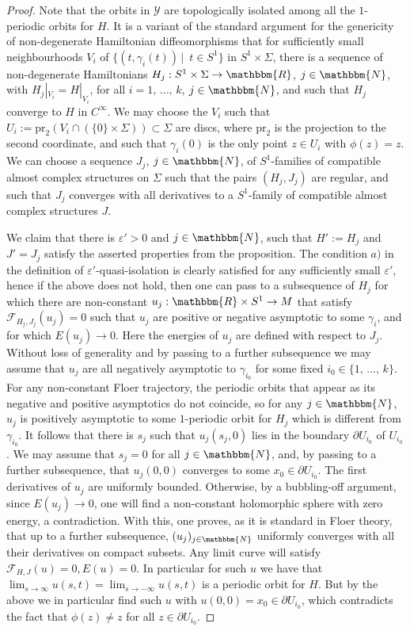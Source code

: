 \documentclass[AHL,Unicode,longabstracts,published]{cedram}
\newcommand{\N}{\mathbbm{N}}
\newcommand{\R}{\mathbbm{R}}
\newcommand{\pr}{\mathrm{pr}}
\newcommand{\clY}{\mathcal{Y}}
\newcommand{\clF}{\mathcal{F}}
\newcounter{claim}
\begin{document}
\begin{proof}
Note that the orbits in $\clY$ are topologically isolated among all the $1$-periodic orbits for $H$. It is a variant of the standard argument for the genericity of non-degenerate Hamiltonian diffeomorphisms that for sufficiently small neighbourhoods $V_i$ of $\{(t,\gamma_i(t))\, |\,$ $t \in S^1 \}$ in $S^1 \times \Sigma$, there is a sequence of non-degenerate Hamiltonians $H_j:S^1 \times \Sigma \to \R$, $j\in \N$, with $H_j|_{V_i} = H|_{V_i}$, for all $i=1, \,\ldots,\, k$, $j\in \N$, and such that $H_j$ converge to $H$ in $C^{\infty}$. We may choose the $V_i$ such that $U_i := {\pr}_2(V_i \cap (\{0\} \times \Sigma))\subset \Sigma$ are discs, where ${\pr}_2$ is the projection to the second coordinate, and such that $\gamma_i(0)$ is the only point $z\in U_i$ with $\phi(z)= z$. We can choose a sequence $J_j$, $j\in \N$, of $S^1$-families of compatible almost complex structures on $\Sigma$ such that the pairs $(H_j,J_j)$ are regular, and such that $J_j$ converges with all derivatives to a $S^1$-family of compatible almost complex structures $J$.

We claim that there is $\varepsilon'>0$ and $j\in \N$, such that $H':=H_j$ and $J'=J_j$ satisfy the asserted properties from the proposition. The condition $a)$ in the definition of $\varepsilon'$-quasi-isolation is clearly satisfied for any sufficiently small $\varepsilon'$, hence if the above does not hold, then one can pass to a subsequence of $H_j$ for which there are non-constant $u_{j}: \R \times S^1\to M$ that satisfy $\clF_{H_{j},J_{j}} (u_j)= 0$ such that $u_j$ are positive or negative asymptotic to some $\gamma_i$, and for which $E(u_j) \to 0$. Here the energies of $u_j$ are defined with respect to $J_j$. Without loss of generality and by passing to a further subsequence we may assume that $u_{j}$ are all negatively asymptotic to $\gamma_{i_0}$ for some fixed $i_0\in \{1, \,\ldots,\, k\}$. For any non-constant Floer trajectory, the periodic orbits that appear as its negative and positive asymptotics do not coincide, so for any $j\in \N$, ${u_j}$ is positively asymptotic to some $1$-periodic orbit for $H_j$ which is different from $\gamma_{i_0}$. It follows that there is $s_j$ such that $u_j(s_j,0)$ lies in the boundary $\partial U_{i_0}$ of $U_{i_0}$. We may assume that $s_j = 0$ for all $j \in \N$, and, by passing to a further subsequence, that $u_j(0,0)$ converges to some $x_0 \in \partial U_{i_0}$. The first derivatives of $u_j$ are uniformly bounded. Otherwise, by a bubbling-off argument, since $E(u_j) \to 0$, one will find a non-constant holomorphic sphere with zero energy, a contradiction. With this, one proves, as it is standard in Floer theory, that up to a further subsequence, $(u_j)_{j\in \N}$ uniformly converges with all their derivatives on compact subsets. Any limit curve will satisfy $\clF_{H,J}(u) = 0, E(u) = 0$. In particular for such $u$ we have that $\lim_{s\to \infty}u(s,t) = \lim_{s\to -\infty}u(s,t)$ is a periodic orbit for $H$. But by the above we in particular find such $u$ with $u(0,0) = x_0\in \partial U_{i_0}$, which contradicts the fact that $\phi(z) \neq z$ for all $z \in \partial U_{i_0}$.
\end{proof}
\end{document}
